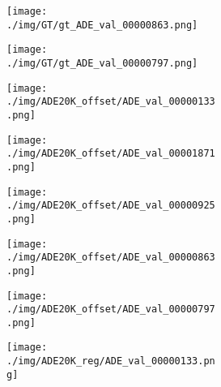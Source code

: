 \documentclass[10pt,twocolumn,letterpaper]{article}
\begin{document}
\begin{figure}
\begin{subfigure}[t]{0.11\textwidth}
\begin{subfigure}[t]{\textwidth}
                \texttt{[image: ./img/GT/gt\_ADE\_val\_00000863.png]}
            \end{subfigure}\vspace{.1ex}

            \begin{subfigure}[t]{\textwidth}
                \texttt{[image: ./img/GT/gt\_ADE\_val\_00000797.png]}
     \captionsetup{justification=centering}       
            \end{subfigure}
    \end{subfigure}
\begin{subfigure}[t]{0.11\textwidth}
        \begin{subfigure}[t]{\textwidth}
                \texttt{[image: ./img/ADE20K\_offset/ADE\_val\_00000133.png]}
            \end{subfigure}\vspace{.1ex}

        \begin{subfigure}[t]{\textwidth}
                \texttt{[image: ./img/ADE20K\_offset/ADE\_val\_00001871.png]}
            \end{subfigure}\vspace{.1ex}

        \begin{subfigure}[t]{\textwidth}
                \texttt{[image: ./img/ADE20K\_offset/ADE\_val\_00000925.png]}
            \end{subfigure}\vspace{.1ex}

\begin{subfigure}[t]{\textwidth}
                \texttt{[image: ./img/ADE20K\_offset/ADE\_val\_00000863.png]}
            \end{subfigure}\vspace{.1ex}

            \begin{subfigure}[t]{\textwidth}
                \texttt{[image: ./img/ADE20K\_offset/ADE\_val\_00000797.png]}
            \captionsetup{justification=centering}
        \label{d}
            \end{subfigure}
    \end{subfigure}
\begin{subfigure}[t]{0.11\textwidth}
        \begin{subfigure}[t]{\textwidth}
                \texttt{[image: ./img/ADE20K\_reg/ADE\_val\_00000133.png]}
            \end{subfigure}\vspace{.1ex}


\end{subfigure}
\end{figure}
\end{document}
